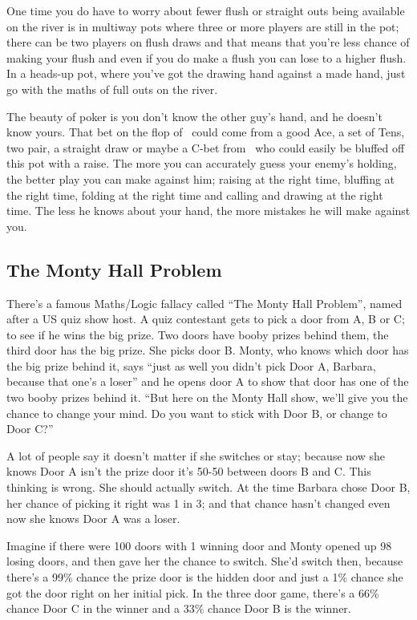 One time you do have to worry about fewer flush or straight outs being
available on the river is in multiway pots where three or more players
are still in the pot; there can be two players on flush draws and that
means that you're less chance of making your flush and even if you do
make a flush you can lose to a higher flush. In a heads-up
pot, where you've got the drawing hand against a made hand, just go
with the maths of full outs on the river.

The beauty of poker is you don't know the other guy's hand, and he
doesn't know yours. That bet on the flop of \Ad\tens\eigd\ could come
from a good Ace, a set of Tens, two pair, a straight draw or maybe a
C-bet from \sixc\sixs\ who could easily be bluffed off this pot with a
raise. The more you can accurately guess your enemy's holding, the
better play you can make against him; raising at the right time,
bluffing at the right time, folding at the right time and calling and
drawing at the right time. The less he knows about your hand, the more
mistakes he will make against you.

\subsection{The Monty Hall Problem}

There's a famous Maths/Logic fallacy called ``The Monty Hall
Problem'', named after a US quiz show host. A quiz contestant gets to
pick a door from A, B or C; to see if he wins the big prize. Two doors
have booby prizes behind them, the third door has the big prize. She picks
door B. Monty, who knows which door has the big prize behind it, says
``just as well you didn't pick Door A, Barbara, because that one's a
loser'' and he opens door A to show that door has one of the two booby
prizes behind it. ``But here on the Monty Hall show, we'll give you the
chance to change your mind. Do you want to stick with Door B, or
change to Door C?''

A lot of people say it doesn't matter if she switches or stay; because
now she knows Door A isn't the prize door it's 50-50 between doors B
and C. This thinking is wrong. She should actually switch. At the time
Barbara chose Door B, her chance of picking it right was 1 in 3; and
that chance hasn't changed even now she knows Door A was a loser.

Imagine if there were 100 doors with 1 winning door and Monty opened
up 98 losing doors, and then gave her the chance to
switch. She'd switch then, because there's a 99\% chance the prize
door is the hidden door and just a 1\% chance she got the door right
on her initial pick. In the three door game, there's a 66\% chance
Door C in the winner and a 33\% chance Door B is the winner.

